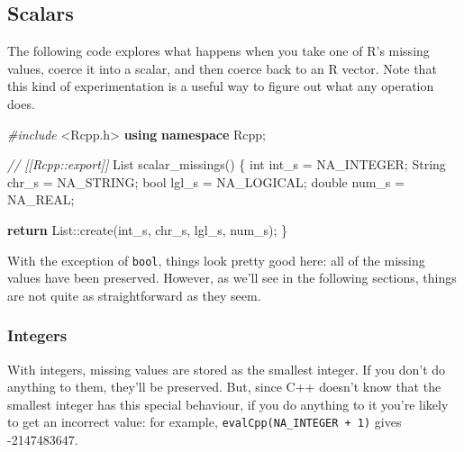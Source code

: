 \documentclass[]{book}
\newenvironment{Shaded}{\begin{snugshade}}{\end{snugshade}}
\newcommand{\CommentTok}[1]{\textcolor[rgb]{0.37,0.37,0.37}{\textit{#1}}}
\newcommand{\ControlFlowTok}[1]{\textcolor[rgb]{0.27,0.27,0.27}{\textbf{#1}}}
\newcommand{\DataTypeTok}[1]{\textcolor[rgb]{0.27,0.27,0.27}{#1}}
\newcommand{\ImportTok}[1]{#1}
\newcommand{\KeywordTok}[1]{\textcolor[rgb]{0.27,0.27,0.27}{\textbf{#1}}}
\newcommand{\NormalTok}[1]{#1}
\newcommand{\PreprocessorTok}[1]{\textcolor[rgb]{0.37,0.37,0.37}{\textit{#1}}}
\begin{document}
\hypertarget{scalars}{%
\subsection{Scalars}\label{scalars}}

The following code explores what happens when you take one of R's missing values, coerce it into a scalar, and then coerce back to an R vector. Note that this kind of experimentation is a useful way to figure out what any operation does.

\begin{Shaded}
\begin{Highlighting}[]
\PreprocessorTok{#include }\ImportTok{<Rcpp.h>}
\KeywordTok{using} \KeywordTok{namespace}\NormalTok{ Rcpp;}

\CommentTok{// [[Rcpp::export]]}
\NormalTok{List scalar_missings() \{}
  \DataTypeTok{int}\NormalTok{ int_s = NA_INTEGER;}
\NormalTok{  String chr_s = NA_STRING;}
  \DataTypeTok{bool}\NormalTok{ lgl_s = NA_LOGICAL;}
  \DataTypeTok{double}\NormalTok{ num_s = NA_REAL;}

  \ControlFlowTok{return}\NormalTok{ List::create(int_s, chr_s, lgl_s, num_s);}
\NormalTok{\}}
\end{Highlighting}
\end{Shaded}

\begin{Shaded}
\end{Shaded}

With the exception of \texttt{bool}, things look pretty good here: all of the missing values have been preserved. However, as we'll see in the following sections, things are not quite as straightforward as they seem.

\hypertarget{integers}{%
\subsubsection{Integers}\label{integers}}

With integers, missing values are stored as the smallest integer. If you don't do anything to them, they'll be preserved. But, since C++ doesn't know that the smallest integer has this special behaviour, if you do anything to it you're likely to get an incorrect value: for example, \texttt{evalCpp(\textquotesingle{}NA\_INTEGER\ +\ 1\textquotesingle{})} gives -2147483647.
\end{document}
